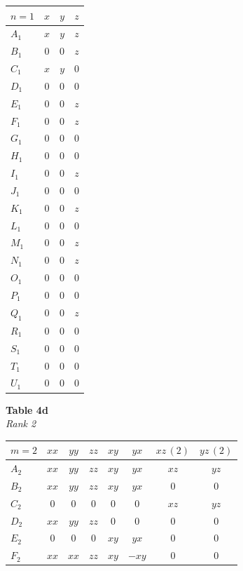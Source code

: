 \documentclass[a4paper,11pt]{article}
\begin{document}
\begin{landscape}
{\begin{minipage}[t]{0.22\textwidth}
\begin{tabular}{@{}l c c c@{}}
\toprule
$n\!=\!1$ & $x$ & $y$ & $z$ \\
\midrule
$A_1$ & $x$ & $y$ & $z$ \\
$B_1$ & $0$ & $0$ & $z$ \\
$C_1$ & $x$ & $y$ & $0$ \\
$D_1$ & $0$ & $0$ & $0$ \\
$E_1$ & $0$ & $0$ & $z$ \\
$F_1$ & $0$ & $0$ & $z$ \\
$G_1$ & $0$ & $0$ & $0$ \\
$H_1$ & $0$ & $0$ & $0$ \\
$I_1$ & $0$ & $0$ & $z$ \\
$J_1$ & $0$ & $0$ & $0$ \\
$K_1$ & $0$ & $0$ & $z$ \\
$L_1$ & $0$ & $0$ & $0$ \\
$M_1$ & $0$ & $0$ & $z$ \\
$N_1$ & $0$ & $0$ & $z$ \\
$O_1$ & $0$ & $0$ & $0$ \\
$P_1$ & $0$ & $0$ & $0$ \\
$Q_1$ & $0$ & $0$ & $z$ \\
$R_1$ & $0$ & $0$ & $0$ \\
$S_1$ & $0$ & $0$ & $0$ \\
$T_1$ & $0$ & $0$ & $0$ \\
$U_1$ & $0$ & $0$ & $0$ \\
\bottomrule
\end{tabular}
\end{minipage}%
\hfill
\begin{minipage}[t]{0.60\textwidth}
\centering
\textbf{Table 4d}\\[2pt]
\textit{Rank 2}\\[4pt]
\begin{tabular}{@{}l c c c c c c c@{}}
\toprule
$m\!=\!2$ & $xx$ & $yy$ & $zz$ & $xy$ & $yx$ & $xz\,(2)$ & $yz\,(2)$ \\
\midrule
$A_2$ & $xx$ & $yy$ & $zz$ & $xy$ & $yx$ & $xz$ & $yz$ \\
$B_2$ & $xx$ & $yy$ & $zz$ & $xy$ & $yx$ & $0$ & $0$ \\
$C_2$ & $0$ & $0$ & $0$ & $0$ & $0$ & $xz$ & $yz$ \\
$D_2$ & $xx$ & $yy$ & $zz$ & $0$ & $0$ & $0$ & $0$ \\
$E_2$ & $0$ & $0$ & $0$ & $xy$ & $yx$ & $0$ & $0$ \\
$F_2$ & $xx$ & $xx$ & $zz$ & $xy$ & $-xy$ & $0$ & $0$ \\

\end{tabular}
\end{minipage}}
\end{landscape}
\end{document}

